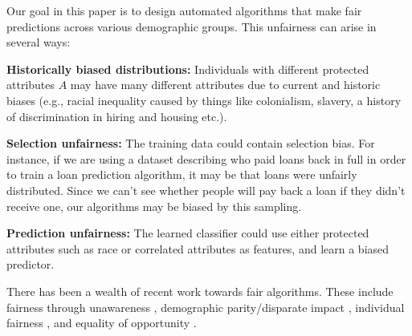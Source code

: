 Our goal in this paper is to design automated algorithms that make fair predictions across various demographic groups. This unfairness can arise in several ways:
\begin{description}
\item {\bf Historically biased distributions:} Individuals with different protected attributes $A$  may have many different attributes due to current and historic biases (e.g., racial inequality caused by things like colonialism,
slavery, a history of discrimination in hiring and
housing etc.). %

\item {\bf Selection unfairness:} The training data could contain selection bias. For instance, if we are using a dataset describing who paid loans back in full in order to train a loan prediction algorithm, it may be that loans were unfairly distributed. Since we can't see whether people will pay back a loan if they didn't receive one, our algorithms may be biased by this sampling.
\item {\bf Prediction unfairness:} The learned classifier could use either protected attributes such as race or correlated attributes as features, and  learn a biased predictor.
\end{description}
There has been a wealth of recent work towards fair
algorithms. %
These include fairness through unawareness \cite{grgiccase}, demographic
parity/disparate impact \cite{zafar2015learning}, individual fairness
\cite{dwork2012fairness,zemel2013learning,louizos2015variational,joseph2016rawlsian}, and
equality of opportunity \cite{hardt2016equality,zafar2016fairness}.


